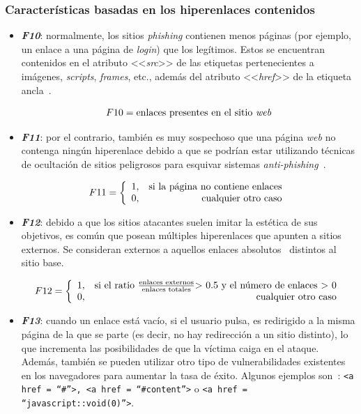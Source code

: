 \subsubsection{Características basadas en los hiperenlaces contenidos}

\begin{itemize}
	\item \textit{\textbf{F10}}: normalmente, los sitios \textit{phishing} contienen menos páginas (por ejemplo, un enlace a una página de \textit{login}) que los legítimos. Estos se encuentran contenidos en el atributo <<\textit{src}>> de las etiquetas pertenecientes a imágenes, \textit{scripts}, \textit{frames}, etc., además del atributo <<\textit{href}>> de la etiqueta ancla~\cite{anclaMozilla}.
	
	\begin{equation}\label{eqn:phishing_f10} F10 = \text{enlaces presentes en el sitio \textit{web}} \end{equation}
		
	\item \textit{\textbf{F11}}: por el contrario, también es muy sospechoso que una página \textit{web} no contenga ningún hiperenlace debido a que se podrían estar utilizando técnicas de ocultación de sitios peligrosos para esquivar sistemas \textit{anti-phishing}~\cite{hiperlinkHidingTechniques}.

	\[F11 = \left\{ \begin{array}{lr} 1, & \text{si la página no contiene enlaces}\\ 
	0, & \text{\raggedright cualquier otro caso} \label{eqn:phishing_f11} \end{array}\right.\]
	
	\item \textit{\textbf{F12}}: debido a que los sitios atacantes suelen imitar la estética de sus objetivos, es común que posean múltiples hiperenlaces que apunten a sitios externos. Se consideran externos a aquellos enlaces absolutos~\cite{enlacesAbsRel} distintos al sitio base.

	\[F12 = \left\{ \begin{array}{lr} 1, & \text{si el ratio } \frac{\text{enlaces externos}}{\text{enlaces totales}} \text{> 0.5 y el número de enlaces > 0} \\
	0, & \text{\raggedright cualquier otro caso} \label{eqn:phishing_f12} \end{array}\right.\]


	\item \textit{\textbf{F13}}: cuando un enlace está vacío, si el usuario pulsa, es redirigido a la misma página de la que se parte (es decir, no hay redirección a un sitio distinto), lo que incrementa las posibilidades de que la víctima caiga en el ataque. Además, también se pueden utilizar otro tipo de vulnerabilidades existentes en los navegadores para aumentar la tasa de éxito. Algunos ejemplos son~\cite{featuresPhishing2018Gupta}: \texttt{<a href = “\#”>, <a href = “\#content”>} o \texttt{<a href = “javascript::void(0)”>}.


\end{itemize}
